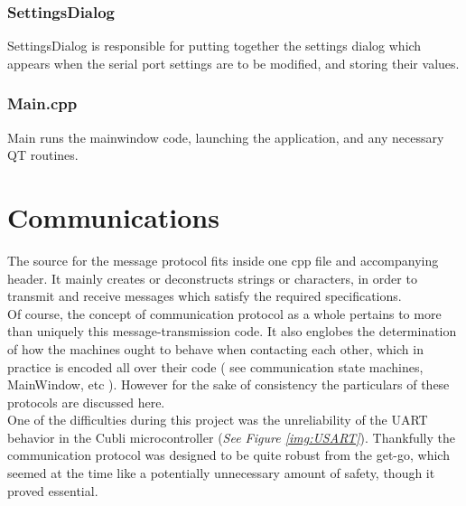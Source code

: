 \subsubsection{SettingsDialog}

SettingsDialog is responsible for putting together the settings dialog which appears when the serial port settings are to be modified, and storing their values.

\subsubsection{Main.cpp}

Main runs the mainwindow code, launching the application, and any necessary QT routines.

\section{Communications}

The source for the message protocol fits inside one cpp file and accompanying header. It mainly creates or deconstructs strings or characters, in order to transmit and receive messages which satisfy the required specifications.\\

Of course, the concept of communication protocol as a whole pertains to more than uniquely this message-transmission code. It also englobes the determination of how the machines ought to behave when contacting each other, which in practice is encoded all over their code ( see communication state machines, MainWindow, etc ). However for the sake of consistency the particulars of these protocols are discussed here.\\

One of the difficulties during this project was the unreliability of the UART behavior in the Cubli microcontroller (\textit{See Figure \ref{img:USART}}). Thankfully the communication protocol was designed to be quite robust from the get-go, which seemed at the time like a potentially unnecessary amount of safety, though it proved essential.

